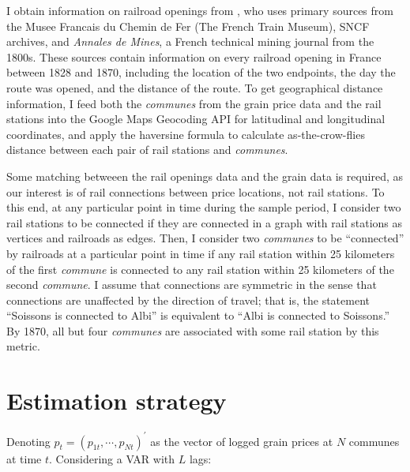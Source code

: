 \documentclass[12pt,twoside]{article}
\begin{document}
I obtain information on railroad openings from \cite{palau2,palau3,palau4}, who uses primary sources from the Musee Francais du Chemin de Fer (The French Train Museum), SNCF archives, and \emph{Annales de Mines}, a French technical mining journal from the 1800s.
These sources contain information on every railroad opening in France between 1828 and 1870, including the location of the two endpoints, the day the route was opened, and the distance of the route.
To get geographical distance information, I feed both the \emph{communes} from the grain price data and the rail stations into the Google Maps Geocoding API \citep{google} for latitudinal and longitudinal coordinates, and apply the haversine formula to calculate as-the-crow-flies distance between each pair of rail stations and \emph{communes}.


Some matching betweeen the rail openings data and the grain data is required, as our interest is of rail connections between price locations, not rail stations.
To this end, at any particular point in time during the sample period, I consider two rail stations to be connected if they are connected in a graph with rail stations as vertices and railroads as edges.
Then, I consider two \emph{communes} to be ``connected'' by railroads at a particular point in time if any rail station within 25 kilometers of the first \emph{commune} is connected to any rail station within 25 kilometers of the second \emph{commune}.
I assume that connections are symmetric in the sense that connections are unaffected by the direction of travel; that is, the statement ``Soissons is connected to Albi'' is equivalent to ``Albi is connected to Soissons.''
By 1870, all but four \emph{communes} are associated with some rail station by this metric. %

	
\section{Estimation strategy}
Denoting $p_t = (p_{1t},\cdots,p_{Nt})^{\prime}$ as the vector of logged grain prices at $N$ communes at time $t$. Considering a VAR with $L$ lags:
\end{document}
